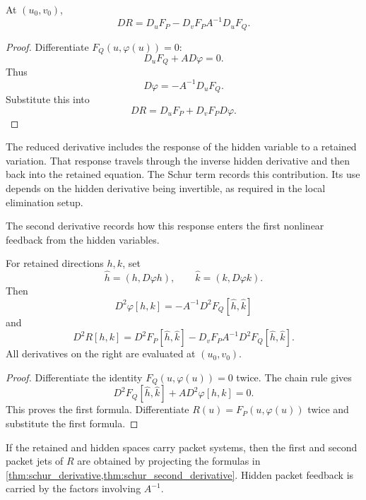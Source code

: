 \begin{theorem}\label{thm:schur_derivative}
At $(u_0,v_0)$,
\[
DR
=
D_uF_P
-
D_vF_P A^{-1}D_uF_Q.
\]
\end{theorem}

\begin{proof}
Differentiate $F_Q(u,\varphi(u))=0$:
\[
D_uF_Q+A D\varphi=0.
\]
Thus
\[
D\varphi=-A^{-1}D_uF_Q.
\]
Substitute this into
\[
DR=D_uF_P+D_vF_PD\varphi.
\]
\end{proof}

\begin{interpretation}[title={The hidden variable still contributes}]
The reduced derivative includes the response of the hidden variable to a retained variation. That response travels through the inverse hidden derivative and then back into the retained equation. The Schur term records this contribution. Its use depends on the hidden derivative being invertible, as required in the local elimination setup.
\end{interpretation}

The second derivative records how this response enters the first nonlinear feedback from the hidden variables.

\begin{theorem}\label{thm:schur_second_derivative}
For retained directions $h,k$, set
\[
\widehat h=(h,D\varphi h),
\qquad
\widehat k=(k,D\varphi k).
\]
Then
\[
D^2\varphi[h,k]
=
-A^{-1}D^2F_Q[\widehat h,\widehat k]
\]
and
\[
D^2R[h,k]
=
D^2F_P[\widehat h,\widehat k]
-
D_vF_P A^{-1}D^2F_Q[\widehat h,\widehat k].
\]
All derivatives on the right are evaluated at $(u_0,v_0)$.
\end{theorem}

\begin{proof}
Differentiate the identity $F_Q(u,\varphi(u))=0$ twice.  The chain rule gives
\[
D^2F_Q[\widehat h,\widehat k]
+A D^2\varphi[h,k]
=0.
\]
This proves the first formula.  Differentiate $R(u)=F_P(u,\varphi(u))$ twice and substitute the first formula.
\end{proof}

\begin{corollary}\label{cor:reduced_packet_jets}
If the retained and hidden spaces carry packet systems, then the first and second packet jets of $R$ are obtained by projecting the formulas in \cref{thm:schur_derivative,thm:schur_second_derivative}.  Hidden packet feedback is carried by the factors involving $A^{-1}$.
\end{corollary}

